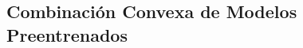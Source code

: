 \documentclass[aspectratio=43,spanish]{beamer}
\newcommand{\upper}[1]{\expandafter\MakeUppercase\expandafter{#1}}
\newcommand{\mymat}[1]{\upper{#1}}
\newcommand{\myvec}[1]{\bm{#1}}
\newcommand{\fv}[1]{\myvec{#1}}
\newcommand{\fm}[1]{\mymat{#1}}
\newcommand{\nsamples}{n}
\newcommand{\ntasks}{T}
\begin{document}
  




  


\subsection{Combinación Convexa de Modelos Preentrenados}
\end{document}
